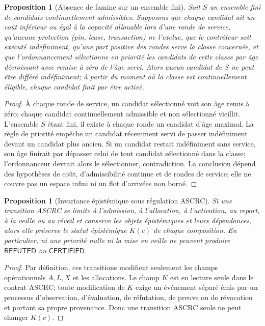 \documentclass[11pt,a4paper]{article}
\theoremstyle{definition}
\theoremstyle{plain}
\newtheorem{proposition}[definition]{Proposition}
\theoremstyle{remark}
\begin{document}
\begin{proposition}[Absence de famine sur un ensemble fini]
Soit $S$ un ensemble fini de candidats continuellement admissibles. Supposons que chaque candidat ait un coût inférieur ou égal à la capacité allouable lors d'une ronde de service, qu'aucune protection (pin, lease, transaction) ne l'exclue, que le contrôleur soit exécuté indéfiniment, qu'une part positive des rondes serve la classe concernée, et que l'ordonnancement sélectionne en priorité les candidats de cette classe par âge décroissant avec remise à zéro de l'âge servi. Alors aucun candidat de $S$ ne peut être différé indéfiniment; à partir du moment où la classe est continuellement éligible, chaque candidat finit par être activé.
\end{proposition}
\begin{proof}
À chaque ronde de service, un candidat sélectionné voit son âge remis à zéro; chaque candidat continuellement admissible et non sélectionné vieillit. L'ensemble $S$ étant fini, il existe à chaque ronde un candidat d'âge maximal. La règle de priorité empêche un candidat récemment servi de passer indéfiniment devant un candidat plus ancien. Si un candidat restait indéfiniment sans service, son âge finirait par dépasser celui de tout candidat sélectionné dans la classe; l'ordonnanceur devrait alors le sélectionner, contradiction. La conclusion dépend des hypothèses de coût, d'admissibilité continue et de rondes de service; elle ne couvre pas un espace infini ni un flot d'arrivées non borné.
\end{proof}
\begin{proposition}[Invariance épistémique sous régulation ASCRC]
Si une transition ASCRC se limite à l'admission, à l'allocation, à l'activation, au report, à la veille ou au réveil et conserve les objets épistémiques et leurs dépendances, alors elle préserve le statut épistémique $K(c)$ de chaque composition. En particulier, ni une priorité nulle ni la mise en veille ne peuvent produire $\mathsf{REFUTED}$ ou $\mathsf{CERTIFIED}$.
\end{proposition}
\begin{proof}
Par définition, ces transitions modifient seulement les champs opérationnels $A,L,X$ et les allocations. Le champ $K$ est en lecture seule dans le contrat ASCRC; toute modification de $K$ exige un événement séparé émis par un processus d'observation, d'évaluation, de réfutation, de preuve ou de révocation et portant sa propre provenance. Donc une transition ASCRC seule ne peut changer $K(c)$.
\end{proof}
\end{document}
